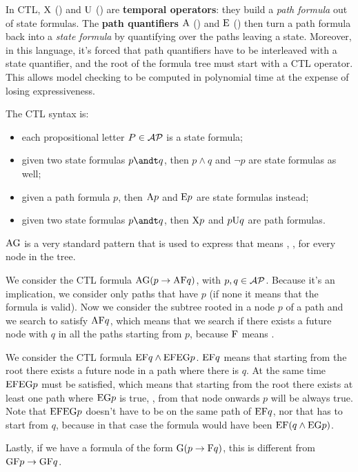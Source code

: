 \documentclass[oneside]{academica}
\begin{document}
In CTL, $\XX$ () and $\UU$ () are \textbf{temporal operators}: they build a \emph{path formula} out of state formulas. The \textbf{path quantifiers} $\AA$ () and $\EE$ () then turn a path formula back into a \emph{state formula} by quantifying over the paths leaving a state.
Moreover, in this language, it's forced that path quantifiers have to be interleaved with a state quantifier, and the root of the formula tree must start with a CTL operator.
This allows model checking to be computed in polynomial time at the expense of losing expressiveness.

The CTL syntax is:
\begin{itemize}
  \item each propositional letter $P \in \AP$ is a state formula;
  \item given two state formulas $p \andt q$, then $p \land q$ and $\neg p$ are state formulas as well;
  \item given a path formula $p$, then $\AA p$ and $\EE p$ are state formulas instead;
  \item given two state formulas $p \andt q$, then $\XX p$ and $p \UU q$ are path formulas.
\end{itemize}

$\AG$ is a very standard pattern that is used to express that means , \ie, for every node in the tree.

\begin{example*}
  We consider the CTL formula $\AG(p \to \AF q)$, with $p,q \in \AP$.
  Because it's an implication, we consider only paths that have $p$ \true (if none it means that the formula is valid).
  Now we consider the subtree rooted in a node $p$ of a path and we search to satisfy $\AF q$, which means that we search if there exists a future node with $q$ in all the paths starting from $p$, because $\FF$ means .
  \begin{center}
    
  \end{center}

  We consider the CTL formula $\EF q \land \EF \EG p$.
  $\EF q$ means that starting from the root there exists a future node in a path where there is $q$.
  At the same time $\EF \EG p$ must be satisfied, which means that starting from the root there exists at least one path where $\EG p$ is true, \ie, from that node onwards $p$ will be always true.
  Note that $\EF \EG p$ doesn't have to be on the same path of $\EF q$, nor that has to start from $q$, because in that case the formula would have been $\EF(q \land \EG p)$.
  \begin{center}
    
  \end{center}

  Lastly, if we have a formula of the form $\GG(p \to \FF q)$, this is different from $\GF p \to \GF q$.
\end{example*}
\end{document}
